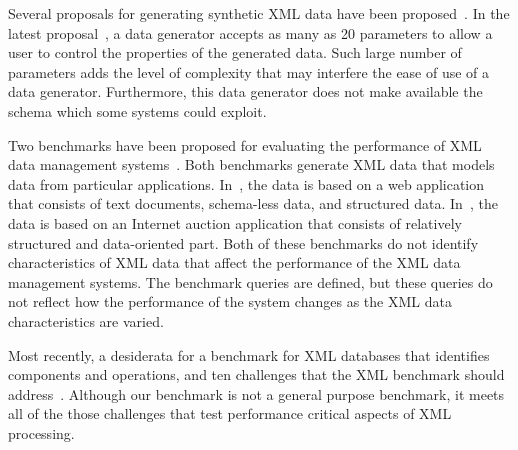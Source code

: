 Several proposals for generating synthetic XML data have been
proposed~\cite{FK99, Aboulnaga01generating}. In the latest
proposal~\cite{Aboulnaga01generating}, a data generator accepts as
many as 20 parameters to allow a user to control the properties of the
generated data. Such large number of parameters adds the level of complexity 
that may interfere the ease of use of a data generator.
Furthermore, this data generator does not make available the schema 
which some systems could exploit.

Two benchmarks have been proposed for evaluating the performance of
XML data management systems~\cite{xmach,xmark}.  Both benchmarks
generate XML data that models data from particular applications.
In~\cite{xmach}, the data is based on a web application that consists
of text documents, schema-less data, and structured
data. In~\cite{xmark}, the data is based on an Internet auction
application that consists of relatively structured and data-oriented
part.  Both of these benchmarks do not identify characteristics of XML
data that affect the performance of the XML data management systems.
The benchmark queries are defined, but these queries do not reflect
how the performance of the system changes as the XML data characteristics 
are varied.

Most recently, a desiderata for a benchmark for XML databases that
identifies components and operations, and ten challenges that the XML benchmark should
address~\cite{SIGMODRECORD01Bench}.  Although our benchmark is not a
general purpose benchmark, it meets all of the those
challenges that test performance critical aspects of XML processing.




